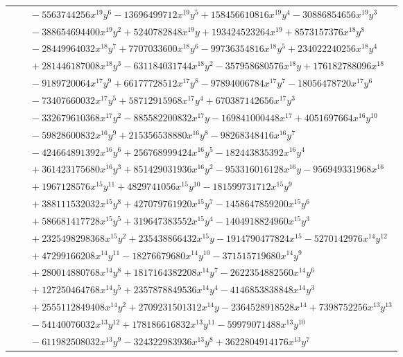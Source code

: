 \documentclass[11pt]{article}
\begin{document}
\begin{longtable}{@{}ll@{}}
 & $\quad -5563744256x^{19}y^{6}-13696499712x^{19}y^{5}+158456610816x^{19}y^{4}-30886854656x^{19}y^{3}$\\
 & $\quad -388654694400x^{19}y^{2}+5240782848x^{19}y+193424523264x^{19}+8573157376x^{18}y^{8}$\\
 & $\quad -28449964032x^{18}y^{7}+7707033600x^{18}y^{6}-99736354816x^{18}y^{5}+234022240256x^{18}y^{4}$\\
 & $\quad +281446187008x^{18}y^{3}-631184031744x^{18}y^{2}-357958680576x^{18}y+176182788096x^{18}$\\
 & $\quad -9189720064x^{17}y^{9}+66177728512x^{17}y^{8}-97894006784x^{17}y^{7}-18056478720x^{17}y^{6}$\\
 & $\quad -73407660032x^{17}y^{5}+58712915968x^{17}y^{4}+670387142656x^{17}y^{3}$\\
 & $\quad -332679610368x^{17}y^{2}-885582200832x^{17}y-169841000448x^{17}+4051697664x^{16}y^{10}$\\
 & $\quad -59828600832x^{16}y^{9}+215356538880x^{16}y^{8}-98268348416x^{16}y^{7}$\\
 & $\quad -424664891392x^{16}y^{6}+256768999424x^{16}y^{5}-182443835392x^{16}y^{4}$\\
 & $\quad +361423175680x^{16}y^{3}+851429031936x^{16}y^{2}-953316016128x^{16}y-956949331968x^{16}$\\
 & $\quad +1967128576x^{15}y^{11}+4829741056x^{15}y^{10}-181599731712x^{15}y^{9}$\\
 & $\quad +388111532032x^{15}y^{8}+427079761920x^{15}y^{7}-1458647859200x^{15}y^{6}$\\
 & $\quad +586681417728x^{15}y^{5}+319647383552x^{15}y^{4}-1404918824960x^{15}y^{3}$\\
 & $\quad +2325498298368x^{15}y^{2}+235438866432x^{15}y-1914790477824x^{15}-5270142976x^{14}y^{12}$\\
 & $\quad +47299166208x^{14}y^{11}-18276679680x^{14}y^{10}-371515719680x^{14}y^{9}$\\
 & $\quad +280014880768x^{14}y^{8}+1817164382208x^{14}y^{7}-2622354882560x^{14}y^{6}$\\
 & $\quad +127250464768x^{14}y^{5}+2357878849536x^{14}y^{4}-4146853838848x^{14}y^{3}$\\
 & $\quad +2555112849408x^{14}y^{2}+2709231501312x^{14}y-2364528918528x^{14}+7398752256x^{13}y^{13}$\\
 & $\quad -54140076032x^{13}y^{12}+178186616832x^{13}y^{11}-59979071488x^{13}y^{10}$\\
 & $\quad -611982508032x^{13}y^{9}-324322983936x^{13}y^{8}+3622804914176x^{13}y^{7}$\\

\end{longtable}
\end{document}
